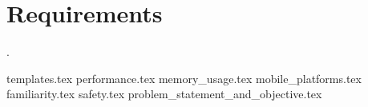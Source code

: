 \chapter{Requirements}
\label{chap:requirements}

.

{templates.tex}
{performance.tex}
{memory_usage.tex}
{mobile_platforms.tex}
{familiarity.tex}
{safety.tex}
{problem_statement_and_objective.tex}
